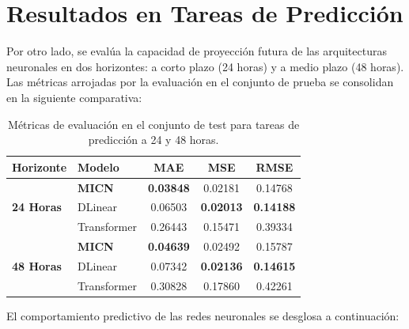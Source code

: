 \section{Resultados en Tareas de Predicción}
\label{sec:results_forecasting}

Por otro lado, se evalúa la capacidad de proyección futura de las arquitecturas neuronales en dos horizontes: a corto plazo (24 horas) y a medio plazo (48 horas). Las métricas arrojadas por la evaluación en el conjunto de prueba se consolidan en la siguiente comparativa:

\begin{table}[H]
	\centering
	\caption{Métricas de evaluación en el conjunto de test para tareas de predicción a 24 y 48 horas.}
	\label{tab:resultados_forecasting}
	\begin{tabular}{llccc}
		\toprule
		\textbf{Horizonte} & \textbf{Modelo} & \textbf{MAE} & \textbf{MSE} & \textbf{RMSE} \\
		\midrule
		\multirow{3}{*}{\textbf{24 Horas}} & \textbf{MICN} & \textbf{0.03848} & 0.02181 & 0.14768 \\
		& DLinear & 0.06503 & \textbf{0.02013} & \textbf{0.14188} \\
		& Transformer & 0.26443 & 0.15471 & 0.39334 \\
		\midrule
		\multirow{3}{*}{\textbf{48 Horas}} & \textbf{MICN} & \textbf{0.04639} & 0.02492 & 0.15787 \\
		& DLinear & 0.07342 & \textbf{0.02136} & \textbf{0.14615} \\
		& Transformer & 0.30828 & 0.17860 & 0.42261 \\
		\bottomrule
	\end{tabular}
\end{table}

El comportamiento predictivo de las redes neuronales se desglosa a continuación:

